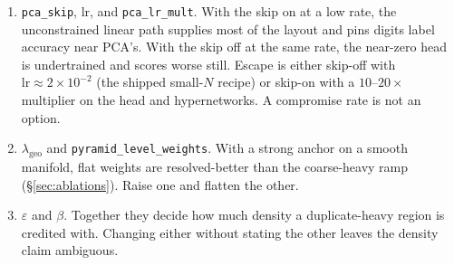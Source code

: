 \documentclass[12pt]{iopart}
\theoremstyle{definition}
\theoremstyle{plain}
\theoremstyle{remark}
\newcommand{\code}[1]{\texttt{#1}}
\begin{document}
\begin{enumerate}[leftmargin=*]
\item \code{pca\_skip}, $\mathrm{lr}$, and \code{pca\_lr\_mult}. With the skip
  on at a low rate, the unconstrained linear path supplies most of the layout
  and pins digits label accuracy near PCA's. With the skip off at the same rate,
  the near-zero head is undertrained and scores worse still. Escape is either
  skip-off with $\mathrm{lr}\approx2\times10^{-2}$ (the shipped small-$N$
  recipe) or skip-on with a $10$--$20\times$ multiplier on the head and
  hypernetworks. A compromise rate is not an option.
\item $\lambda_{\mathrm{geo}}$ and \code{pyramid\_level\_weights}. With a strong
  anchor on a smooth manifold, flat weights are resolved-better than the
  coarse-heavy ramp (\S\ref{sec:ablations}). Raise one and flatten the other.
\item $\varepsilon$ and $\beta$. Together they decide how much density a
  duplicate-heavy region is credited with. Changing either without stating the
  other leaves the density claim ambiguous.
\end{enumerate}
\end{document}
